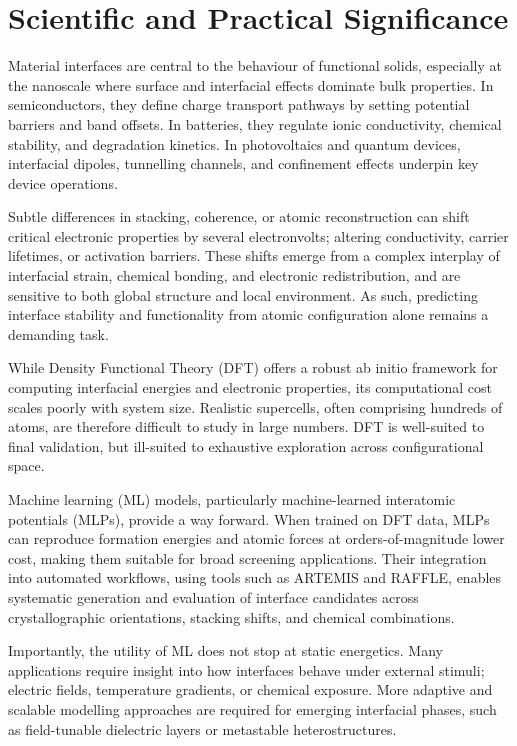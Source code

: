 \section{Scientific and Practical Significance} \label{section:scientific_and_practical_significance}

Material interfaces are central to the behaviour of functional solids, especially at the nanoscale where surface and interfacial effects dominate bulk properties. In semiconductors, they define charge transport pathways by setting potential barriers and band offsets. In batteries, they regulate ionic conductivity, chemical stability, and degradation kinetics. In photovoltaics and quantum devices, interfacial dipoles, tunnelling channels, and confinement effects underpin key device operations.

Subtle differences in stacking, coherence, or atomic reconstruction can shift critical electronic properties by several electronvolts; altering conductivity, carrier lifetimes, or activation barriers. These shifts emerge from a complex interplay of interfacial strain, chemical bonding, and electronic redistribution, and are sensitive to both global structure and local environment. As such, predicting interface stability and functionality from atomic configuration alone remains a demanding task.

While Density Functional Theory (DFT) offers a robust ab initio framework for computing interfacial energies and electronic properties, its computational cost scales poorly with system size. Realistic supercells, often comprising hundreds of atoms, are therefore difficult to study in large numbers. DFT is well-suited to final validation, but ill-suited to exhaustive exploration across configurational space.

Machine learning (ML) models, particularly machine-learned interatomic potentials (MLPs), provide a way forward. When trained on DFT data, MLPs can reproduce formation energies and atomic forces at orders-of-magnitude lower cost, making them suitable for broad screening applications.  Their integration into automated workflows, using tools such as ARTEMIS and RAFFLE, enables systematic generation and evaluation of interface candidates across crystallographic orientations, stacking shifts, and chemical combinations.

Importantly, the utility of ML does not stop at static energetics. Many applications require insight into how interfaces behave under external stimuli; electric fields, temperature gradients, or chemical exposure. More adaptive and scalable modelling approaches are required for emerging interfacial phases, such as field-tunable dielectric layers or metastable heterostructures.

